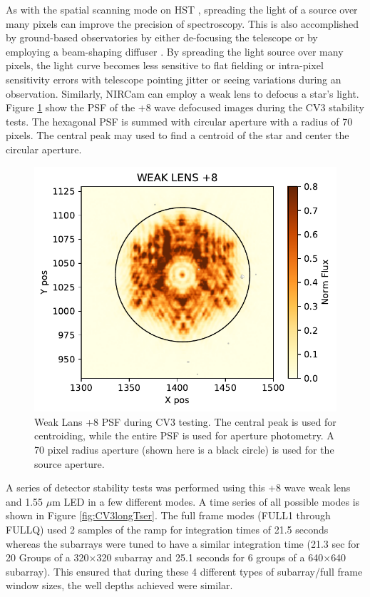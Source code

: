 \documentclass{aastex62}
\begin{document}
As with the spatial scanning mode on HST \citep[e.g.][]{mccullough2012spatialScan,deming13}, spreading the light of a source over many pixels can improve the precision of spectroscopy.
This is also accomplished by ground-based observatories by either de-focusing the telescope \citep{southworth2009defocusing} or by employing a beam-shaping diffuser \citep{stefansson2017diffusers}.
By spreading the light source over many pixels, the light curve becomes less sensitive to flat fielding or intra-pixel sensitivity errors with telescope pointing jitter or seeing variations during an observation.
Similarly, NIRCam can employ a weak lens to defocus a star's light.
Figure \ref{fig:WLP8PSF} show the PSF of the +8 wave defocused images during the CV3 stability tests.
The hexagonal PSF is summed with circular aperture with a radius of 70 pixels.
The central peak may used to find a centroid of the star and center the circular aperture.

\begin{figure}[!hbtp]
\centering
\includegraphics[width=.49\columnwidth]{wlp8_psf.pdf}
\caption{Weak Lans +8 PSF during CV3 testing.
The central peak is used for centroiding, while the entire PSF is used for aperture photometry.
A 70 pixel radius aperture (shown here is a black circle) is used for the source aperture.}\label{fig:WLP8PSF}
\end{figure}

A series of detector stability tests was performed using this +8 wave weak lens and 1.55 $\mu$m LED in a few different modes.
A time series of all possible modes is shown in Figure \ref{fig:CV3longTser}.
The full frame modes (FULL1 through FULLQ) used 2 samples of the ramp for integration times of 21.5 seconds whereas the subarrays were tuned to have a similar integration time (21.3 sec for 20 Groups of a 320$\times$320 subarray and 25.1 seconds for 6 groups of a 640$\times$640 subarray).
This ensured that during these 4 different types of subarray/full frame window sizes, the well depths achieved were similar.
\end{document}
